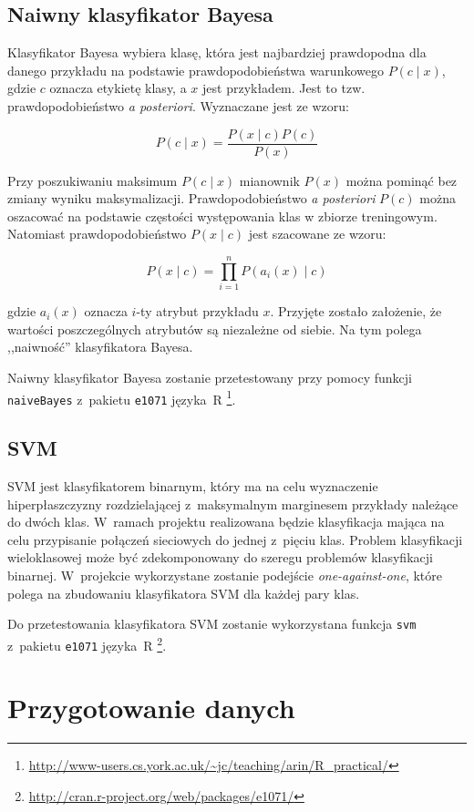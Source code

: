 \documentclass[a4paper, 12pt]{article}
\begin{document}
\subsection{Naiwny klasyfikator Bayesa}

Klasyfikator Bayesa wybiera klasę, która jest najbardziej prawdopodna dla danego przykładu na 
podstawie prawdopodobieństwa
warunkowego $P(c \mid x)$, gdzie $c$ oznacza etykietę klasy, a $x$ jest przykładem. 
Jest to tzw. prawdopodobieństwo
\textit{a posteriori}. Wyznaczane jest ze wzoru:

$$ P(c \mid x) = \frac{P(x \mid c)P(c)}{P(x)} $$

Przy poszukiwaniu maksimum $P(c \mid x)$ mianownik $P(x)$ można pominąć bez zmiany wyniku 
maksymalizacji.
Prawdopodobieństwo \textit{a posteriori} $P(c)$ można oszacować na podstawie częstości 
występowania klas w zbiorze treningowym.
Natomiast prawdopodobieństwo $P(x \mid c)$ jest szacowane ze wzoru:

$$ P(x \mid c) = \prod_{i=1}^n P(a_i(x) \mid c)$$

gdzie $a_i(x)$ oznacza $i$-ty atrybut przykładu $x$.
Przyjęte zostało założenie, że wartości poszczególnych atrybutów są niezależne od siebie.
Na tym polega ,,naiwność'' klasyfikatora Bayesa.

Naiwny klasyfikator Bayesa zostanie przetestowany przy pomocy funkcji \texttt{naiveBayes} z~pakietu \texttt{e1071} języka~R
\footnote{\url{http://www-users.cs.york.ac.uk/~jc/teaching/arin/R_practical/}}.

\subsection{SVM}
SVM jest klasyfikatorem binarnym, który ma na celu wyznaczenie hiperpłaszczyzny rozdzielającej 
z~maksymalnym marginesem przykłady należące do dwóch klas. W~ramach projektu realizowana będzie 
klasyfikacja mająca na celu przypisanie połączeń sieciowych do jednej z~pięciu klas. 
Problem klasyfikacji wieloklasowej może być zdekomponowany do szeregu problemów klasyfikacji binarnej. 
W~projekcie wykorzystane zostanie podejście \textit{one-against-one}, 
które polega na zbudowaniu klasyfikatora SVM dla każdej pary klas. 

Do przetestowania klasyfikatora SVM zostanie wykorzystana funkcja \texttt{svm} z~pakietu 
\texttt{e1071} języka~R \footnote{\url{http://cran.r-project.org/web/packages/e1071/}}.

\section{Przygotowanie danych}
\end{document}
